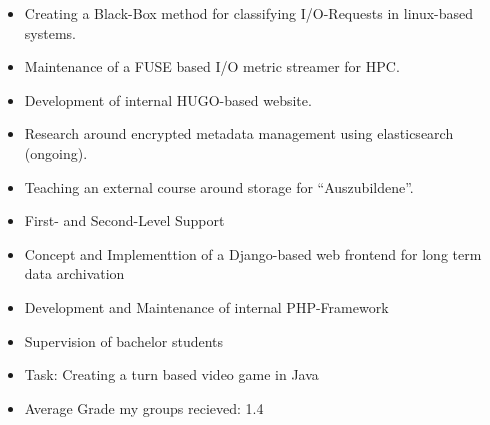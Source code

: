 \documentclass[10pt,a4paper,ragged2e,withhyper]{altacv}
\begin{document}
\begin{paracol}{2}

\medskip
\begin{itemize}
\item Creating a Black-Box method for classifying I/O-Requests in linux-based systems.
\item Maintenance of a FUSE based I/O metric streamer for HPC.
\item Development of internal HUGO-based website.
\item Research around encrypted metadata management using elasticsearch (ongoing).
\item Teaching an external course around storage for ``Auszubildene''.
\end{itemize}

\divider
{}
\medskip
\begin{itemize}
\item First- and Second-Level Support
\item Concept and Implementtion of a Django-based web frontend for long term data archivation
\end{itemize}

\divider

\medskip
\begin{itemize}
\item Development and Maintenance of internal PHP-Framework
\end{itemize}

\divider

\medskip
\begin{itemize}
\item Supervision of bachelor students
\item Task: Creating a turn based video game in Java
\item Average Grade my groups recieved: 1.4
\end{itemize}


\end{paracol}
\end{document}
